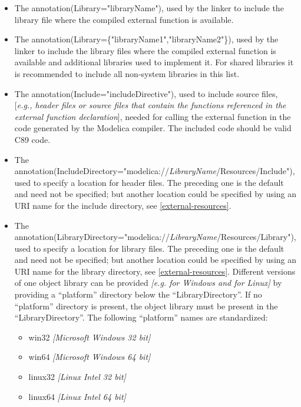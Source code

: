 \begin{itemize}
\item
  The annotation(Library="libraryName"), used by the linker to include
  the library file where the compiled external function is available.
\item
  The annotation(Library=\{"libraryName1","libraryName2"\}), used by the
  linker to include the library files where the compiled external
  function is available and additional libraries used to implement it.
  For shared libraries it is recommended to include all non-system
  libraries in this list.
\item
  The annotation(Include="includeDirective"), used to include source
  files, {[}\emph{e.g., header files or source files that contain the
  functions referenced in the external function declaration}{]}, needed
  for calling the external function in the code generated by the
  Modelica compiler. The included code should be valid C89 code.
\item
  The
  annotation(IncludeDirectory="modelica://\emph{LibraryName}/Resources/Include"),
  used to specify a location for header files. The preceding one is the
  default and need not be specified; but another location could be
  specified by using an URI name for the include directory, see \autoref{external-resources}.
\item
  The
  annotation(LibraryDirectory="modelica://\emph{LibraryName}/Resources/Library"),
  used to specify a location for library files. The preceding one is the
  default and need not be specified; but another location could be
  specified by using an URI name for the library directory, see \autoref{external-resources}. 
  Different versions of one object library can be provided
  \emph{{[}e.g. for Windows and for Linux{]}} by providing a
  ``platform'' directory below the ``LibraryDirectory''. If no
  ``platform'' directory is present, the object library must be present
  in the ``LibraryDirectory''. The following ``platform'' names are
  standardized:

  \begin{itemize}
  \item
    win32 \emph{{[}Microsoft Windows 32 bit{]}}
  \item
    win64 \emph{{[}Microsoft Windows 64 bit{]}}
  \item
    linux32 \emph{{[}Linux Intel 32 bit{]}}
  \item
    linux64 \emph{{[}Linux Intel 64 bit{]}}
  \end{itemize}
\end{itemize}

